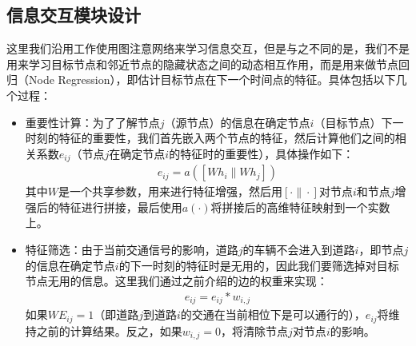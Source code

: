 \subsection{信息交互模块设计}
这里我们沿用工作使用图注意网络来学习信息交互，但是与之不同的是，我们不是用来学习目标节点和邻近节点的隐藏状态之间的动态相互作用，而是用来做节点回归（Node Regression），即估计目标节点在下一个时间点的特征。具体包括以下几个过程：
\begin{itemize}
  \item 重要性计算：为了了解节点$j$（源节点）的信息在确定节点$i$（目标节点）下一时刻的特征的重要性，我们首先嵌入两个节点的特征，然后计算他们之间的相关系数$e_{i j}$（节点$j$在确定节点$i$的特征时的重要性），具体操作如下：
  \begin{align}
    e_{i j}=a\left(\left[W h_{i} \| W h_{j}\right]\right)
  \end{align}
  其中$W$是一个共享参数，用来进行特征增强，然后用$[\cdot \| \cdot]$对节点$i$和节点$j$增强后的特征进行拼接，最后使用$a(\cdot)$将拼接后的高维特征映射到一个实数上。
  
  \item 特征筛选：由于当前交通信号的影响，道路$j$的车辆不会进入到道路$i$，即节点$j$的信息在确定节点$i$的下一时刻的特征时是无用的，因此我们要筛选掉对目标节点无用的信息。这里我们通过之前介绍的边的权重来实现：
  \begin{align}
    \label{eq:mul_phase}
    e_{i j} = e_{i j} * w_{i,j}
  \end{align}
  如果$WE_{i j} = 1$（即道路$j$到道路$i$的交通在当前相位下是可以通行的），$e_{ij}$将维持之前的计算结果。反之，如果$w_{i,j}=0$，将清除节点$j$对节点$i$的影响。
  

\end{itemize}
